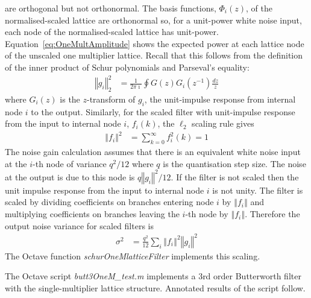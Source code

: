 \documentclass[a4paper,twoside,10pt,english]{report}
\begin{document}
are orthogonal but not orthonormal. The basis functions, 
$\Phi_{i}\left(z\right)$,
of the normalised-scaled lattice are orthonormal so, for a unit-power
white noise input, each node of the normalised-scaled lattice has
unit-power. Equation~\ref{eq:OneMultAmplitude} shows the expected
power at each lattice node of the unscaled one multiplier lattice.
Recall that this follows from the definition of the inner product
of Schur polynomials and Parseval's equality:
\begin{align*}
\left\Vert g_{i}\right\Vert _{2}^{2} & = \frac{1}{2\pi \imath}\oint G\left(z\right)G_{i}\left(z^{-1}\right)\frac{dz}{z}
\end{align*}
where $G_{i}\left(z\right)$ is the $z$-transform of $g_{i}$, the
unit-impulse response from internal node $i$ to the output. Similarly,
for the scaled filter with unit-impulse response from the input to
internal node $i$, $f_{i}(k)$, the $\ell_{2}$ scaling rule gives
\begin{align*}
\left\Vert f_{i}\right\Vert ^{2} & = \sum_{k=0}^{\infty}f_{i}^{2}\left(k\right)=1
\end{align*}
The noise gain calculation assumes that there is an equivalent white
noise input at the $i$-th node of variance $q^{2}/12$ where $q$
is the quantisation step size. The noise at the output is due to this
node is $q\left\Vert g_{i}\right\Vert ^{2}/12$. If the filter is
not scaled then the unit impulse response from the input to internal
node $i$ is not unity. The filter is scaled by dividing coefficients
on branches entering node $i$ by $\left\Vert f_{i}\right\Vert $
and multiplying coefficients on branches leaving the $i$-th node
by $\left\Vert f_{i}\right\Vert $. Therefore the output noise variance
for scaled filters is 
\begin{align*}
\sigma^{2} & = \frac{q^{2}}{12}\sum_{i}\left\Vert f_{i}\right\Vert ^{2}\left\Vert g_{i}\right\Vert ^{2}
\end{align*}
The Octave function \emph{schurOneMlatticeFilter} implements this scaling.

The Octave script \emph{butt3OneM\_test.m}
implements a 3rd order Butterworth filter with the single-multiplier
lattice structure. Annotated results of the script follow. 
\end{document}
